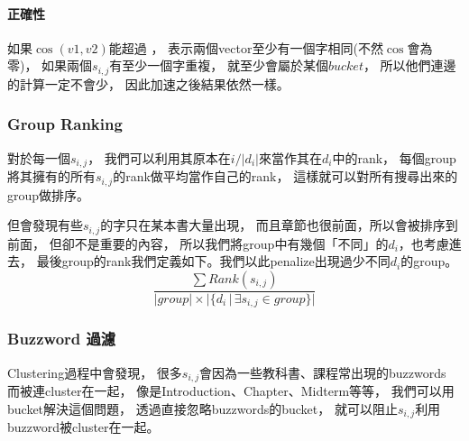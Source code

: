 \noindent \paragraph{正確性}
如果$\cos(v1,v2)$能超過 ，
表示兩個vector至少有一個字相同(不然$\cos$會為零)，
如果兩個$s_{i,j}$有至少一個字重複，
就至少會屬於某個$\mathit{bucket}$，
所以他們連邊的計算一定不會少，
因此加速之後結果依然一樣。

\subsubsection{Group Ranking}
對於每一個$s_{i,j}$，
我們可以利用其原本在$i/|d_i|$來當作其在$d_i$中的rank，
每個group將其擁有的所有$s_{i,j}$的rank做平均當作自己的rank，
這樣就可以對所有搜尋出來的group做排序。

但會發現有些$s_{i,j}$的字只在某本書大量出現，
而且章節也很前面，所以會被排序到前面，
但卻不是重要的內容，
所以我們將group中有幾個「不同」的$d_i$，也考慮進去，
最後group的rank我們定義如下。我們以此penalize出現過少不同$d_i$的group。
\[ \frac
    {\sum \mathit{Rank}(s_{i,j})}
    {|\mathit{group}|\times |\{d_i \,|\, \exists s_{i,j} \in group\}|} \]

\subsubsection{Buzzword 過濾}
Clustering過程中會發現，
很多$s_{i,j}$會因為一些教科書、課程常出現的buzzwords
而被連cluster在一起，
像是Introduction、Chapter、Midterm等等，
我們可以用bucket解決這個問題，
透過直接忽略buzzwords的bucket，
就可以阻止$s_{i,j}$利用buzzword被cluster在一起。
